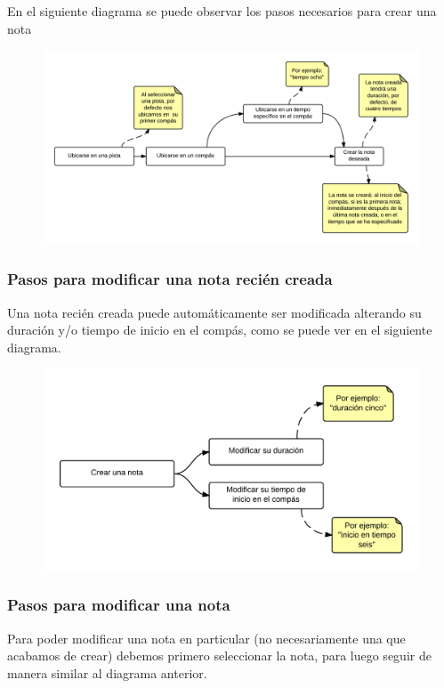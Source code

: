 En el siguiente diagrama se puede observar los pasos necesarios para crear una nota

\begin{figure}[H]
\includegraphics[width=0.9\linewidth]{./graphics/pasos-crear-nota2.png}
\end{figure}

\subsubsection{Pasos para modificar una nota reci\'en creada}
Una nota reci\'en creada puede autom\'aticamente ser modificada alterando su duraci\'on y/o 
tiempo de inicio en el comp\'as, como se puede ver en el siguiente diagrama.

\begin{figure}[H]
\includegraphics[width=0.9\linewidth]{./graphics/pasos-modificar-nota-recien-creada.png}
\end{figure}

\subsubsection{Pasos para modificar una nota}
Para poder modificar una nota en particular (no necesariamente una que acabamos de crear) debemos 
primero seleccionar la nota, para luego seguir de manera similar al diagrama anterior.

